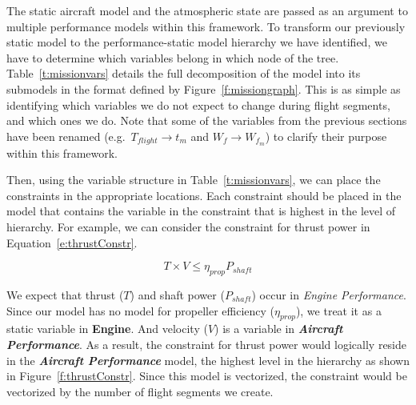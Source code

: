 The static aircraft model and the atmospheric state are passed as an argument to multiple
performance models within this framework. To transform our previously static model to
the performance-static model hierarchy we have identified,
we have to determine which variables
belong in which node of the tree. Table~\ref{t:missionvars} details the full
decomposition of the model into its submodels in the format defined
by Figure~\ref{f:missiongraph}. This is as simple as identifying which variables
we do not expect to change during flight segments, and which ones we do. Note that
some of the variables from the previous sections
have been renamed (e.g.\ $T_{flight} \rightarrow t_m$ and $W_f \rightarrow W_{f_m}$)
to clarify their purpose within this framework.

\begin{center}
    
    \label{t:missionvars}
\end{center}

Then, using the variable structure in Table~\ref{t:missionvars}, we can place the
constraints in the appropriate locations. Each constraint should be placed
in the model that contains the variable in the constraint that is highest in the level of hierarchy. For example,
we can consider the constraint for thrust power in Equation~\ref{e:thrustConstr}.

\begin{equation}
    \label{e:thrustConstr}
    T \times V \leq \eta_{prop} P_{shaft}
\end{equation}

We expect that thrust ($T$) and shaft power ($P_{shaft}$) occur
in \textit{Engine Performance}. Since our model has no model for propeller efficiency ($\eta_{prop}$), we treat it
as a static variable in \textbf{Engine}. And velocity ($V$) is a variable in \textbf{\textit{Aircraft {Performance}}}.
As a result, the constraint for thrust power would logically reside in the \textbf{\textit{Aircraft {Performance}}}
model, the highest level in the hierarchy as shown in Figure~\ref{f:thrustConstr}. Since this model is vectorized,
the constraint would be vectorized by the number of flight segments we create.

